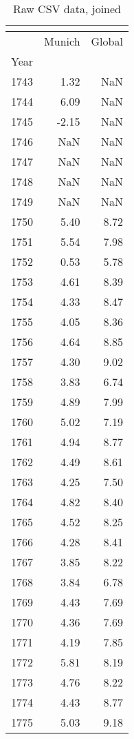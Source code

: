 \begin{longtable}{lrr}
\caption{Raw CSV data, joined} \\
\label{csv_data} \\
\toprule
{} &  Munich &  Global \\
Year &         &         \\
\midrule
\endhead
1743 &    1.32 &     NaN \\
1744 &    6.09 &     NaN \\
1745 &   -2.15 &     NaN \\
1746 &     NaN &     NaN \\
1747 &     NaN &     NaN \\
1748 &     NaN &     NaN \\
1749 &     NaN &     NaN \\
1750 &    5.40 &    8.72 \\
1751 &    5.54 &    7.98 \\
1752 &    0.53 &    5.78 \\
1753 &    4.61 &    8.39 \\
1754 &    4.33 &    8.47 \\
1755 &    4.05 &    8.36 \\
1756 &    4.64 &    8.85 \\
1757 &    4.30 &    9.02 \\
1758 &    3.83 &    6.74 \\
1759 &    4.89 &    7.99 \\
1760 &    5.02 &    7.19 \\
1761 &    4.94 &    8.77 \\
1762 &    4.49 &    8.61 \\
1763 &    4.25 &    7.50 \\
1764 &    4.82 &    8.40 \\
1765 &    4.52 &    8.25 \\
1766 &    4.28 &    8.41 \\
1767 &    3.85 &    8.22 \\
1768 &    3.84 &    6.78 \\
1769 &    4.43 &    7.69 \\
1770 &    4.36 &    7.69 \\
1771 &    4.19 &    7.85 \\
1772 &    5.81 &    8.19 \\
1773 &    4.76 &    8.22 \\
1774 &    4.43 &    8.77 \\
1775 &    5.03 &    9.18 \\

\end{longtable}

